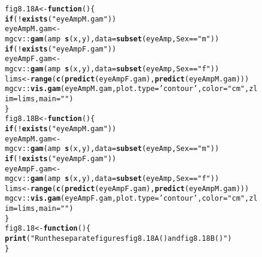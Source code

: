 \documentclass[12pt, a4paper,  BCOR=8.25mm, DIV=15]{scrartcl}\usepackage[]{graphicx}\usepackage[]{color}
\makeatletter
\newcommand{\hlstr}[1]{\textcolor[rgb]{0.192,0.494,0.8}{#1}}%
\newcommand{\hlopt}[1]{\textcolor[rgb]{0,0,0}{#1}}%
\newcommand{\hlstd}[1]{\textcolor[rgb]{0.345,0.345,0.345}{#1}}%
\newcommand{\hlkwa}[1]{\textcolor[rgb]{0.161,0.373,0.58}{\textbf{#1}}}%
\newcommand{\hlkwb}[1]{\textcolor[rgb]{0.69,0.353,0.396}{#1}}%
\newcommand{\hlkwc}[1]{\textcolor[rgb]{0.333,0.667,0.333}{#1}}%
\newcommand{\hlkwd}[1]{\textcolor[rgb]{0.737,0.353,0.396}{\textbf{#1}}}%
\newenvironment{kframe}{%
 \def\at@end@of@kframe{}%
 \ifinner\ifhmode%
  \def\at@end@of@kframe{\end{minipage}}%
  \begin{minipage}{\columnwidth}%
 \fi\fi%
 \def\FrameCommand##1{\hskip\@totalleftmargin \hskip-\fboxsep
 \colorbox{shadecolor}{##1}\hskip-\fboxsep
     \hskip-\linewidth \hskip-\@totalleftmargin \hskip\columnwidth}%
 \MakeFramed {\advance\hsize-\width
   \@totalleftmargin\z@ \linewidth\hsize
   \@setminipage}}%
 {\par\unskip\endMakeFramed%
 \at@end@of@kframe}
\newenvironment{knitrout}{}{} %
\makeatother
\begin{document}
\begin{figure}
\begin{knitrout}
\color{fgcolor}\begin{kframe}
\begin{alltt}
\hlstd{fig8.18A} \hlkwb{<-} \hlkwa{function}\hlstd{()\{}
    \hlkwa{if}\hlstd{(}\hlopt{!}\hlkwd{exists}\hlstd{(}\hlstr{"eyeAmpM.gam"}\hlstd{))}
\hlstd{eyeAmpM.gam} \hlkwb{<-} \hlstd{mgcv}\hlopt{::}\hlkwd{gam}\hlstd{(amp} \hlopt{~} \hlkwd{s}\hlstd{(x,y),} \hlkwc{data}\hlstd{=}\hlkwd{subset}\hlstd{(eyeAmp, Sex}\hlopt{==}\hlstr{"m"}\hlstd{))}
        \hlkwa{if}\hlstd{(}\hlopt{!}\hlkwd{exists}\hlstd{(}\hlstr{"eyeAmpF.gam"}\hlstd{))}
\hlstd{eyeAmpF.gam} \hlkwb{<-} \hlstd{mgcv}\hlopt{::}\hlkwd{gam}\hlstd{(amp} \hlopt{~} \hlkwd{s}\hlstd{(x,y),} \hlkwc{data}\hlstd{=}\hlkwd{subset}\hlstd{(eyeAmp, Sex}\hlopt{==}\hlstr{"f"}\hlstd{))}
\hlstd{lims} \hlkwb{<-} \hlkwd{range}\hlstd{(}\hlkwd{c}\hlstd{(}\hlkwd{predict}\hlstd{(eyeAmpF.gam),} \hlkwd{predict}\hlstd{(eyeAmpM.gam)))}
\hlstd{mgcv}\hlopt{::}\hlkwd{vis.gam}\hlstd{(eyeAmpM.gam,} \hlkwc{plot.type}\hlstd{=}\hlstr{'contour'}\hlstd{,} \hlkwc{color}\hlstd{=}\hlstr{"cm"}\hlstd{,} \hlkwc{zlim}\hlstd{=lims,} \hlkwc{main}\hlstd{=}\hlstr{""}\hlstd{)}
\hlstd{\}}
\hlstd{fig8.18B} \hlkwb{<-} \hlkwa{function}\hlstd{()\{}
    \hlkwa{if}\hlstd{(}\hlopt{!}\hlkwd{exists}\hlstd{(}\hlstr{"eyeAmpM.gam"}\hlstd{))}
    \hlstd{eyeAmpM.gam} \hlkwb{<-} \hlstd{mgcv}\hlopt{::}\hlkwd{gam}\hlstd{(amp} \hlopt{~} \hlkwd{s}\hlstd{(x,y),} \hlkwc{data}\hlstd{=}\hlkwd{subset}\hlstd{(eyeAmp, Sex}\hlopt{==}\hlstr{"m"}\hlstd{))}
    \hlkwa{if}\hlstd{(}\hlopt{!}\hlkwd{exists}\hlstd{(}\hlstr{"eyeAmpF.gam"}\hlstd{))}
    \hlstd{eyeAmpF.gam} \hlkwb{<-} \hlstd{mgcv}\hlopt{::}\hlkwd{gam}\hlstd{(amp} \hlopt{~} \hlkwd{s}\hlstd{(x,y),} \hlkwc{data}\hlstd{=}\hlkwd{subset}\hlstd{(eyeAmp, Sex}\hlopt{==}\hlstr{"f"}\hlstd{))}
\hlstd{lims} \hlkwb{<-} \hlkwd{range}\hlstd{(}\hlkwd{c}\hlstd{(}\hlkwd{predict}\hlstd{(eyeAmpF.gam),} \hlkwd{predict}\hlstd{(eyeAmpM.gam)))}
\hlstd{mgcv}\hlopt{::}\hlkwd{vis.gam}\hlstd{(eyeAmpF.gam,} \hlkwc{plot.type}\hlstd{=}\hlstr{'contour'}\hlstd{,} \hlkwc{color}\hlstd{=}\hlstr{"cm"}\hlstd{,} \hlkwc{zlim}\hlstd{=lims,} \hlkwc{main}\hlstd{=}\hlstr{""}\hlstd{)}
\hlstd{\}}
\hlstd{fig8.18} \hlkwb{<-} \hlkwa{function}\hlstd{()\{}
\hlkwd{print}\hlstd{(}\hlstr{"Run the separate figures fig8.18A() and fig8.18B()"}\hlstd{)}
\hlstd{\}}
\end{alltt}
\end{kframe}
\end{knitrout}
\end{figure}
\end{document}
